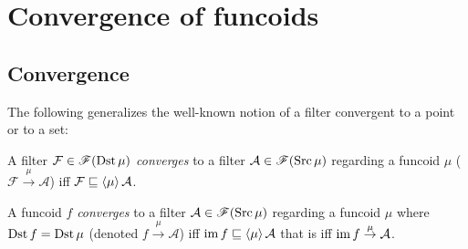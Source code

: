 
\chapter{Convergence of funcoids}


\section{Convergence}

The following generalizes the well-known notion of a filter convergent
to a point or to a set:
\begin{defn}
A filter $\mathcal{F}\in\mathscr{F}(\operatorname{Dst}\mu)$
\emph{converges} to a filter $\mathcal{A}\in\mathscr{F}(\operatorname{Src}\mu)$
regarding a funcoid $\mu$ ($\mathcal{F}\overset{\mu}{\rightarrow}\mathcal{A}$)
iff $\mathcal{F}\sqsubseteq\left\langle \mu\right\rangle\mathcal{A}$.
\end{defn}

\begin{defn}
A funcoid $f$ \emph{converges}
to a filter $\mathcal{A}\in\mathscr{F}(\operatorname{Src}\mu)$ regarding a funcoid
$\mu$ where $\operatorname{Dst} f=\operatorname{Dst}\mu$ (denoted $f\overset{\mu}{\rightarrow}\mathcal{A}$)
iff $\operatorname{im} f\sqsubseteq\left\langle \mu\right\rangle\mathcal{A}$ that is iff $\operatorname{im} f\overset{\mu}{\rightarrow}\mathcal{A}$.
\end{defn}

